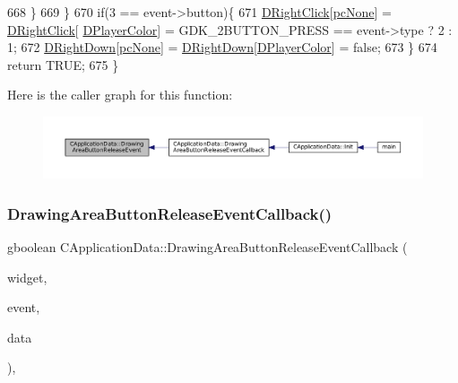 \begin{DoxyCode}
668         \}
669     \}
670     \textcolor{keywordflow}{if}(3 == event->button)\{
671         \hyperlink{classCApplicationData_a845b854113fb8742338ada01af8b9351}{DRightClick}[\hyperlink{GameDataTypes_8h_aafb0ca75933357ff28a6d7efbdd7602fa88767aa8e02c7b3192bbab4127b3d729}{pcNone}] = \hyperlink{classCApplicationData_a845b854113fb8742338ada01af8b9351}{DRightClick}[
      \hyperlink{classCApplicationData_a53550939b20cba70570f113e4d1c5d02}{DPlayerColor}] = GDK\_2BUTTON\_PRESS == \textcolor{keyword}{event}->type ? 2 : 1;
672         \hyperlink{classCApplicationData_a0eb2ef18b6e71e98517f8b813a658164}{DRightDown}[\hyperlink{GameDataTypes_8h_aafb0ca75933357ff28a6d7efbdd7602fa88767aa8e02c7b3192bbab4127b3d729}{pcNone}] = \hyperlink{classCApplicationData_a0eb2ef18b6e71e98517f8b813a658164}{DRightDown}[\hyperlink{classCApplicationData_a53550939b20cba70570f113e4d1c5d02}{DPlayerColor}] = \textcolor{keyword}{false};
673     \}
674     \textcolor{keywordflow}{return} TRUE;
675 \}
\end{DoxyCode}
Here is the caller graph for this function\+:\nopagebreak
\begin{figure}[H]
\begin{center}
\leavevmode
\includegraphics[width=350pt]{classCApplicationData_a7df4d71ef6fabf7eac740c95cfe3cd81_icgraph}
\end{center}
\end{figure}
\hypertarget{classCApplicationData_a2708d2083c8c2e7c8de126b40eb17b3f}{}\label{classCApplicationData_a2708d2083c8c2e7c8de126b40eb17b3f} 
\subsubsection{\texorpdfstring{Drawing\+Area\+Button\+Release\+Event\+Callback()}{DrawingAreaButtonReleaseEventCallback()}}
{\footnotesize\ttfamily gboolean C\+Application\+Data\+::\+Drawing\+Area\+Button\+Release\+Event\+Callback (\begin{DoxyParamCaption}\item[{Gtk\+Widget $\ast$}]{widget,  }\item[{Gdk\+Event\+Button $\ast$}]{event,  }\item[{gpointer}]{data }\end{DoxyParamCaption})\hspace{0.3cm}{\ttfamily [static]}, {\ttfamily [protected]}}



